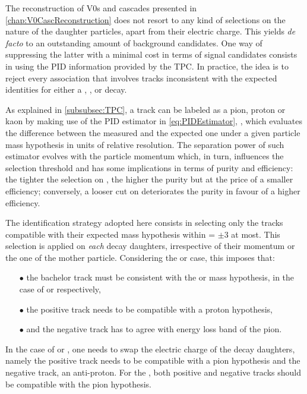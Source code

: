 The reconstruction of V0s and cascades presented in \chap\ref{chap:V0CascReconstruction} does not resort to any kind of selections on the nature of the daughter particles, apart from their electric charge. This yields \textit{de facto} to an outstanding amount of background candidates. One way of suppressing the latter with a minimal cost in terms of signal candidates consists in using the PID information provided by the TPC. In practice, the idea is to reject every association that involves tracks inconsistent with the expected identities for either a \rmKzeroS, \rmLambdaPM, \rmXiPM or \rmOmegaPM decay.

As explained in \Sec\ref{subsubsec:TPC}, a track can be labeled as a pion, proton or kaon by making use of the PID estimator in \eq\ref{eq:PIDEstimator}, \Nsigma, which evaluates the difference between the measured \dEdx and the expected one under a given particle mass hypothesis in units of relative resolution. The separation power of such estimator evolves with the particle momentum which, in turn, influences the selection threshold and has some implications in terms of purity and efficiency: the tighter the selection on \Nsigma, the higher the purity but at the price of a smaller efficiency; conversely, a looser cut on \Nsigma deteriorates the purity in favour of a higher efficiency.

The identification strategy adopted here consists in selecting only the tracks compatible with their expected mass hypothesis within \Nsigma = $\pm 3$ at most. This selection is applied on \emph{each} decay daughters, irrespective of their momentum or the one of the mother particle. Considering the \rmXiM or \rmOmegaM case, this imposes that:
\begin{itemize}
\item[$\bullet$] the bachelor track must be consistent with the \rmPiMinus or \rmKMinus mass hypothesis, in the case of \rmXiM or \rmOmegaM respectively,
\item[$\bullet$] the positive track needs to be compatible with a proton hypothesis,
\item[$\bullet$] and the negative track has to agree with energy loss band of the pion.
\end{itemize}
In the case of \rmAxiP or \rmAomegaP, one needs to swap the electric charge of the  decay daughters, namely the positive track needs to be compatible with a pion hypothesis and the negative track, an anti-proton. For the \rmKzeroS, both positive and negative tracks should be compatible with the pion hypothesis.


